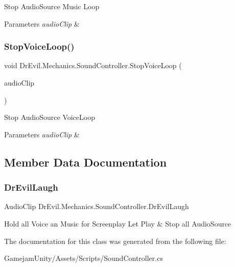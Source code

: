 Stop Audio\+Source Music Loop 


\begin{DoxyParams}{Parameters}
{\em audio\+Clip} & \\
\hline
\end{DoxyParams}
\mbox{\label{class_dr_evil_1_1_mechanics_1_1_sound_controller_a130372d19c0564c1119a1d94281f4b7e}} 
\subsubsection{\texorpdfstring{Stop\+Voice\+Loop()}{StopVoiceLoop()}}
{\footnotesize\ttfamily void Dr\+Evil.\+Mechanics.\+Sound\+Controller.\+Stop\+Voice\+Loop (\begin{DoxyParamCaption}\item[{Audio\+Clip}]{audio\+Clip }\end{DoxyParamCaption})\hspace{0.3cm}{\ttfamily [inline]}}



Stop Audio\+Source Voice\+Loop 


\begin{DoxyParams}{Parameters}
{\em audio\+Clip} & \\
\hline
\end{DoxyParams}


\subsection{Member Data Documentation}
\mbox{\label{class_dr_evil_1_1_mechanics_1_1_sound_controller_a1bf0d2d46e1805f3ccd105125f5225f8}} 
\subsubsection{\texorpdfstring{Dr\+Evil\+Laugh}{DrEvilLaugh}}
{\footnotesize\ttfamily Audio\+Clip Dr\+Evil.\+Mechanics.\+Sound\+Controller.\+Dr\+Evil\+Laugh}



Hold all Voice an Music for Screenplay Let Play \& Stop all Audio\+Source 



The documentation for this class was generated from the following file\+:\begin{DoxyCompactItemize}
\item 
Gamejam\+Unity/\+Assets/\+Scripts/Sound\+Controller.\+cs\end{DoxyCompactItemize}
